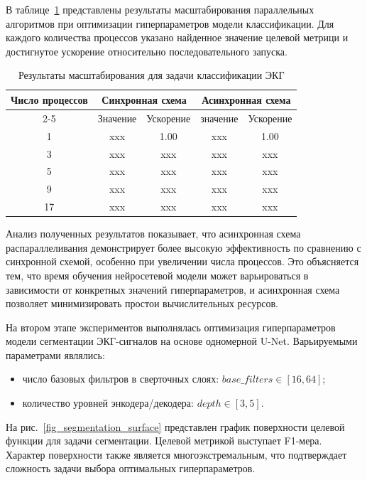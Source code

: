 \documentclass[11pt, oneside, a4paper]{article}
\begin{document}
В таблице~\ref{tab_classification_scalability} представлены результаты масштабирования параллельных алгоритмов при оптимизации гиперпараметров модели классификации. Для каждого количества процессов указано найденное значение целевой метрици и достигнутое ускорение относительно последовательного запуска.

\begin{table}[ht]
\caption{Результаты масштабирования для задачи классификации ЭКГ}
\label{tab_classification_scalability}
\centering
\begin{tabular}{|c|c|c|c|c|}
\hline
Число процессов & \multicolumn{2}{c|}{Синхронная схема} & \multicolumn{2}{c|}{Асинхронная схема} \\
\cline{2-5}
& Значение & Ускорение & значение & Ускорение \\
\hline
1 & xxx & 1.00 & xxx & 1.00 \\
3 & xxx & xxx & xxx & xxx \\
5 & xxx & xxx & xxx & xxx \\
9 & xxx & xxx & xxx & xxx \\
17 & xxx & xxx & xxx & xxx \\
\hline
\end{tabular}

\end{table}

Анализ полученных результатов показывает, что асинхронная схема распараллеливания демонстрирует более высокую эффективность по сравнению с синхронной схемой, особенно при увеличении числа процессов. Это объясняется тем, что время обучения нейросетевой модели может варьироваться в зависимости от конкретных значений гиперпараметров, и асинхронная схема позволяет минимизировать простои вычислительных ресурсов.


На втором этапе экспериментов выполнялась оптимизация гиперпараметров модели сегментации ЭКГ-сигналов на основе одномерной U-Net. Варьируемыми параметрами являлись:
\begin{itemize}
    \item число базовых фильтров в сверточных слоях: $base\_filters \in [16, 64]$;
    \item количество уровней энкодера/декодера: $depth \in [3, 5]$.
\end{itemize}

На рис.~\ref{fig_segmentation_surface} представлен график поверхности целевой функции для задачи сегментации. Целевой метрикой выступает F1-мера. Характер поверхности также является многоэкстремальным, что подтверждает сложность задачи выбора оптимальных гиперпараметров.
\end{document}
